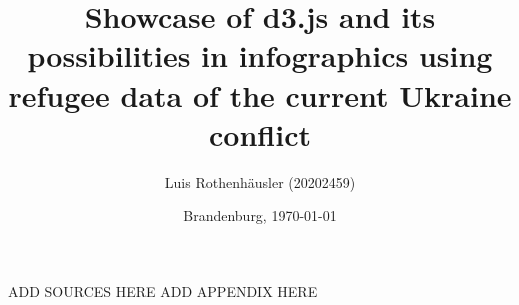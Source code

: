 \documentclass[a4paper,12pt]{report}
\title{Showcase of d3.js and its possibilities in infographics using refugee data of the current Ukraine conflict}
\author{Luis Rothenh\"ausler (20202459)}
\date{Brandenburg, \today{}}
\begin{document}
    \maketitle
    
    \tableofcontents
    
    
    
    
    \newpage
    ADD SOURCES HERE
    \newpage
    ADD APPENDIX HERE
    
\end{document}
